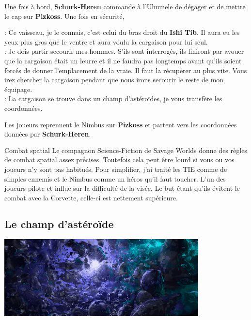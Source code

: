Une fois à bord, \textbf{Schurk-Heren} commande à l’Uhumele de dégager et de mettre le cap sur \textbf{Pizkoss}. Une fois en sécurité, 
\begin{quotebox}
    : Ce vaisseau, je le connais, c’est celui du bras droit du \textbf{Ishi Tib}. Il aura eu les yeux plus gros que le ventre et aura voulu la cargaison pour lui seul.\\
    : Je dois partir secourir mes hommes. S’ils sont interrogés, ils finiront par avouer que la cargaison était un leurre et il ne faudra pas longtemps avant qu’ils soient forcés de donner l’emplacement de la vraie. Il faut la récupérer au plus vite. Vous irez chercher la cargaison pendant que nous irons secourir le reste de mon équipage.\\
    : La cargaison se trouve dans un champ d’astéroïdes, je vous transfère les coordonnées.
\end{quotebox}

Les joueurs reprennent le Nimbus sur \textbf{Pizkoss} et partent vers les coordonnées données par \textbf{Schurk-Heren}.

\begin{paperbox}{Combat spatial}
Le compagnon Science-Fiction de Savage Worlds donne des règles de combat spatial assez précises. Toutefois cela peut être lourd si vous ou vos joueurs n’y sont pas habitués. Pour simplifier, j’ai traité les TIE comme de simples ennemis et le Nimbus comme un héros qu’il faut toucher. L’un des joueurs pilote et influe sur la difficulté de la visée.
Le but étant qu’ils évitent le combat avec la Corvette, celle-ci est nettement supérieure.
\end{paperbox}

\subsection{Le champ d’astéroïde}
\noindent\includegraphics[width=\linewidth]{_img/places/asteroid-field.png}\\

